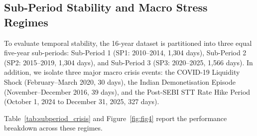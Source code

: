 \documentclass[11pt,a4paper]{article}
\begin{document}
\subsection{Sub-Period Stability and Macro Stress Regimes}
To evaluate temporal stability, the 16-year dataset is partitioned into three equal five-year sub-periods: Sub-Period 1 (SP1: 2010--2014, 1,304 days), Sub-Period 2 (SP2: 2015--2019, 1,304 days), and Sub-Period 3 (SP3: 2020--2025, 1,566 days). In addition, we isolate three major macro crisis events: the COVID-19 Liquidity Shock (February--March 2020, 30 days), the Indian Demonetisation Episode (November--December 2016, 39 days), and the Post-SEBI STT Rate Hike Period (October 1, 2024 to December 31, 2025, 327 days).

Table~\ref{tab:subperiod_crisis} and Figure~\ref{fig:fig4} report the performance breakdown across these regimes.
\end{document}

